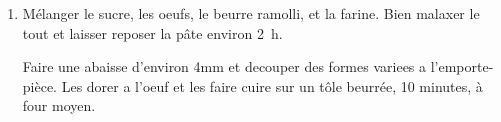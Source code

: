 

\begin{ingredients}
\end{ingredients}


\begin{recipe}
  \begin{enumerate}

  \item M\'elanger le sucre, les oeufs, le beurre ramolli, et la
    farine.  Bien malaxer le tout et laisser reposer la p\^ate environ
    2~h.

    Faire une abaisse d'environ 4mm et decouper des formes variees a
    l'emporte-pi\`ece.  Les dorer a l'oeuf et les faire cuire sur un
    t\^ole beurr\'ee, 10 minutes, \`a four moyen.

  \end{enumerate}
\end{recipe}
